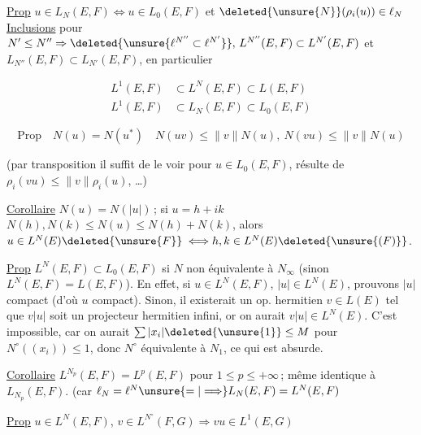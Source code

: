  \uline{Prop} $u\in L_N(E,F)\Longleftrightarrow u\in L_0(E,F)$ et $\deleted{\unsure{N}}(\rho_i(u))\in\ell_N$   \uline{Inclusions} pour $N'\leq N''\Rightarrow\deleted{\unsure{\ell^{N''}\subset\ell^{N'}}},\,L^{N''}(E,F)\subset L^{N'}(E,F)$ et $L_{N''}(E,F)\subset L_{N'}(E,F)$, en particulier

\[
\begin{aligned}
L^1(E,F)&\subset L^N(E,F)\subset L(E,F)\\
L^1(E,F)&\subset L_N(E,F)\subset L_0(E,F)
\end{aligned}
\]


\[
\text{Prop}\quad\boxed{N(u)=N(u^*)\quad N(uv)\leq\lVert v\rVert N(u),\ N(vu)\leq\lVert v\rVert N(u)}
\]

 (par transposition il suffit de le voir pour $u\in L_0(E,F)$,  résulte de $\rho_i(vu)\leq\lVert v\rVert\rho_i(u)$, \ldots)




\uline{Corollaire} $N(u)=N(|u|)$\,; si $u=h+ik$ $N(h),N(k)\leq N(u)\leq N(h)+N(k)$, alors $u\in L^N(E)\deleted{\unsure{F}}$ \deleted{$\Longleftrightarrow$}$\Longleftrightarrow h,k\in L^N(E)\deleted{\unsure{(F)}}$. 


\uline{Prop} $L^N(E,F)\subset L_0(E,F)$ si $N$ non équivalente à $N_\infty$\unsure{;} (sinon $L^N(E,F)=L(E,F)$). En effet, si $u\in L^N(E,F)$,  $|u|\in L^N(E)$, prouvons $|u|$ compact (d'où $u$ compact). Sinon, il existerait un op. hermitien $v\in L(E)$ tel que $v|u|$ soit un projecteur hermitien infini, or on aurait $v|u|\in L^N(E)$. C'est impossible, car on  aurait $\sum|x_i|\deleted{\unsure{1}}\leq M$ pour $N^\circ((x_i))\leq 1$, donc $N^\circ$ équivalente à $N_1$, ce qui est absurde.

\uline{Corollaire} $L^{N_p}(E,F)=L^p(E,F)$ pour $1\leq p\leq+\infty$\,;  même identique à $L_{N_p}(E,F)$. (car $\ell_N=\ell^N\unsure{=|\Longrightarrow}L_N(E,F)=L^N(E,F)$\unsure{)}

\uline{Prop} $u\in L^N(E,F)$, $v\in L^{N^\circ}(F,G)\Rightarrow vu\in L^1(E,G)$


